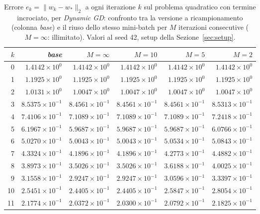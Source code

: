 \begin{table}[H]
\centering
\footnotesize
\renewcommand{\arraystretch}{0.85}
\setlength{\tabcolsep}{4pt}
\caption{Errore $e_k=\|w_k-w_*\|_2$ a ogni iterazione $k$ sul problema quadratico con termine incrociato, per \emph{Dynamic GD}: confronto tra la versione a ricampionamento (colonna \emph{base}) e il riuso dello stesso mini-batch per $M$ iterazioni consecutive ($M=\infty$: illimitato). Valori al seed 42, setup della Sezione~\ref{sec:setup}.}
\label{tab:riuso_offdiag_gd}
\begin{tabular}{@{}rrrrrr@{}}
\toprule
$k$ & \emph{base} & $M{=}\infty$ & $M{=}10$ & $M{=}5$ & $M{=}2$\\
\midrule
0 & $1.4142\times10^{0}$ & $1.4142\times10^{0}$ & $1.4142\times10^{0}$ & $1.4142\times10^{0}$ & $1.4142\times10^{0}$\\
1 & $1.1925\times10^{0}$ & $1.1925\times10^{0}$ & $1.1925\times10^{0}$ & $1.1925\times10^{0}$ & $1.1925\times10^{0}$\\
2 & $1.0131\times10^{0}$ & $1.0047\times10^{0}$ & $1.0047\times10^{0}$ & $1.0047\times10^{0}$ & $1.0047\times10^{0}$\\
3 & $8.5375\times10^{-1}$ & $8.4561\times10^{-1}$ & $8.4561\times10^{-1}$ & $8.4561\times10^{-1}$ & $8.5313\times10^{-1}$\\
4 & $7.4106\times10^{-1}$ & $7.1089\times10^{-1}$ & $7.1089\times10^{-1}$ & $7.1089\times10^{-1}$ & $7.2418\times10^{-1}$\\
5 & $6.1967\times10^{-1}$ & $5.9687\times10^{-1}$ & $5.9687\times10^{-1}$ & $5.9687\times10^{-1}$ & $6.0766\times10^{-1}$\\
6 & $5.0270\times10^{-1}$ & $5.0043\times10^{-1}$ & $5.0043\times10^{-1}$ & $5.0534\times10^{-1}$ & $5.0843\times10^{-1}$\\
7 & $4.3324\times10^{-1}$ & $4.1896\times10^{-1}$ & $4.1896\times10^{-1}$ & $4.2773\times10^{-1}$ & $4.4882\times10^{-1}$\\
8 & $3.8973\times10^{-1}$ & $3.5026\times10^{-1}$ & $3.5026\times10^{-1}$ & $3.6188\times10^{-1}$ & $4.0025\times10^{-1}$\\
9 & $3.1558\times10^{-1}$ & $2.9247\times10^{-1}$ & $2.9247\times10^{-1}$ & $3.0596\times10^{-1}$ & $3.3397\times10^{-1}$\\
10 & $2.5451\times10^{-1}$ & $2.4405\times10^{-1}$ & $2.4405\times10^{-1}$ & $2.5847\times10^{-1}$ & $2.8054\times10^{-1}$\\
11 & $2.1774\times10^{-1}$ & $2.0372\times10^{-1}$ & $2.0300\times10^{-1}$ & $2.0792\times10^{-1}$ & $2.1825\times10^{-1}$\\

\end{tabular}
\end{table}
